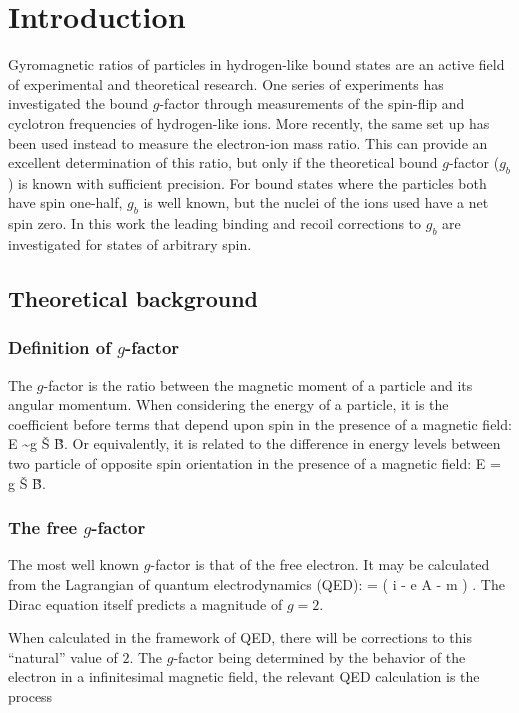 \chapter{Introduction}

Gyromagnetic ratios of particles in hydrogen-like bound states are an active field of experimental and theoretical research.  One series of experiments has investigated the bound $g$-factor through measurements of the spin-flip and cyclotron frequencies of hydrogen-like ions.  More recently, the same set up has been used instead to measure the electron-ion mass ratio.  This can provide an excellent determination of this ratio, but only if the theoretical bound $g$-factor ($g_b$) is known with sufficient precision.  For bound states where the particles both have spin one-half, $g_b$ is well known, but the nuclei of the ions used have a net spin zero.  In this work the leading binding and recoil corrections to $g_b$ are investigated for states of arbitrary spin.



\section{Theoretical background}


\subsection{Definition of $g$-factor}
The $g$-factor is the ratio between the magnetic moment of a particle and its angular momentum.  When considering the energy of a particle, it is the coefficient before terms that depend upon spin in the presence of a magnetic field:
 \beq
 	E \sim  g  \v{S} \cdot \v{B}.
 \eeq
Or equivalently, it is related to the difference in energy levels between two particle of opposite spin orientation in the presence of a magnetic field:
\beq
	\Delta E =  g  \v{S} \cdot \v{B}.
\eeq


\subsection{The free $g$-factor}
The most well known $g$-factor is that of the free electron.  It may be calculated from the Lagrangian of quantum electrodynamics (QED):
\beq
	 = \Psibar \left( i \partial \cdot \gamma - e A \cdot \gamma - m \right ) \Psi.
\eeq
The Dirac equation itself predicts a magnitude of $g=2$.  

When calculated in the framework of QED, there will be corrections to this ``natural'' value of $2$.  The $g$-factor being determined by the behavior of the electron in a infinitesimal magnetic field, the relevant QED calculation is the process

